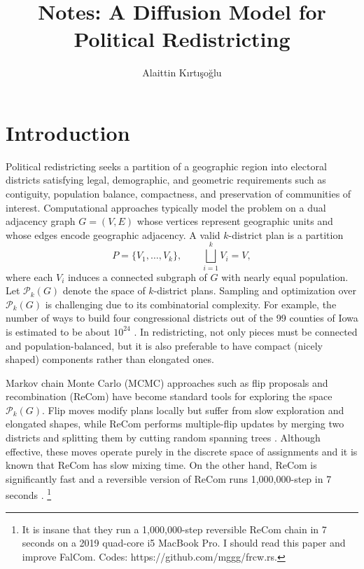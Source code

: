\documentclass[11pt]{article}
\begin{document}
\title{Notes: A Diffusion Model for Political Redistricting}

\author{Alaittin K\i rt\i \c{s}o\u{g}lu}


\maketitle

\tableofcontents

\newpage



\section{Introduction}

Political redistricting seeks a partition of a geographic region into electoral districts satisfying legal, demographic, and geometric requirements such as contiguity, population balance, compactness, and
preservation of communities of interest.  Computational approaches typically model the problem on a dual adjacency graph $G=(V,E)$ whose vertices represent geographic units and whose edges encode geographic adjacency. A valid $k$-district plan is a partition
\[
P=\{V_1,\dots,V_k\}, \qquad \bigsqcup_{i=1}^k V_i = V,
\]
where each $V_i$ induces a connected subgraph of $G$ with nearly equal population. Let $\mathcal P_k(G)$ denote the space of $k$-district plans. Sampling and optimization over $\mathcal P_k(G)$ is challenging due to its combinatorial complexity.  For example, the number of ways to build four congressional districts out of the 99 counties of Iowa is estimated to
be about $10^{24}$ \cite{fifield2020essential}. 
In redistricting, not only pieces must be connected and population-balanced, but it is also preferable to have compact (nicely shaped) components rather than elongated ones. 

Markov chain Monte Carlo (MCMC) approaches such as flip proposals and recombination (ReCom) have become standard tools for exploring the space $\mathcal P_k(G)$. Flip moves modify plans locally but suffer from slow exploration and elongated shapes, while ReCom performs multiple-flip updates by merging two districts and splitting them by cutting random spanning trees \cite{deford2021recombination}. Although effective, these moves operate purely in the discrete space of assignments and it is known that ReCom has slow mixing time. On the other hand, ReCom is significantly fast and a reversible version of ReCom runs 1,000,000-step in 7 seconds \cite{cannon2022spanning}. \footnote{It is insane that they run a 1,000,000-step reversible ReCom chain in 7 seconds on a 2019 quad-core i5 MacBook Pro. I should read this paper and improve FalCom. Codes: https://github.com/mggg/frcw.rs.}
\end{document}
